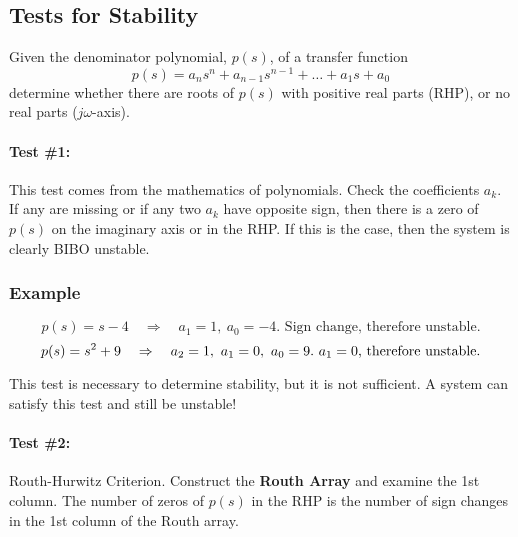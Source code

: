 \documentclass{book}
\newcommand{\jw}{j\omega}
\newcommand{\exmp}{\subsubsection*{Example}}
\begin{document}
\subsection*{Tests for Stability}
Given the denominator polynomial, $ p(s) $, of a transfer function
\[ p(s) = a_ns^n + a_{n-1}s^{n-1} + \ldots + a_1s + a_0 \]
determine whether there are roots of $ p(s) $ with positive real parts (RHP), or no real parts ($ \jw $-axis).

\paragraph{Test \#1:} This test comes from the mathematics of polynomials. Check the coefficients $ a_k $. If any are missing or if any two $ a_k $ have opposite sign, then there is a zero of $ p(s) $ on the imaginary axis or in the RHP. If this is the case, then the system is clearly BIBO unstable. 

\exmp
\[ p(s) = s-4 \quad\Rightarrow\quad a_1=1,\ a_0 = -4. \text{ Sign change, therefore unstable.}\]
\[ p(s) = s^2+9 \quad\Rightarrow\quad a_2=1,\ a_1=0,\ a_0 = 9. \text{ $ a_1 = 0 $, therefore unstable.}\]

This test is necessary to determine stability, but it is not sufficient. A system can satisfy this test and still be unstable!

\paragraph*{Test \#2:} Routh-Hurwitz Criterion. Construct the \textbf{Routh Array} and examine the 1st column. The number of zeros of $ p(s) $ in the RHP is the number of sign changes in the 1st column of the Routh array.
\end{document}

